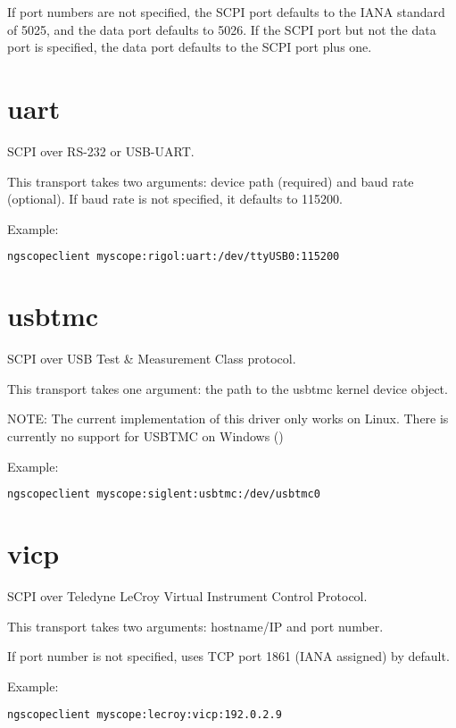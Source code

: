 If port numbers are not specified, the SCPI port defaults to the IANA standard of 5025, and the data port defaults to
5026. If the SCPI port but not the data port is specified, the data port defaults to the SCPI port plus one.

\section{uart}

SCPI over RS-232 or USB-UART.

This transport takes two arguments: device path (required) and baud rate (optional). If baud rate is not specified, it
defaults to 115200.

Example:
\begin{lstlisting}[language=sh, numbers=none]
ngscopeclient myscope:rigol:uart:/dev/ttyUSB0:115200
\end{lstlisting}

\section{usbtmc}

SCPI over USB Test \& Measurement Class protocol.

This transport takes one argument: the path to the usbtmc kernel device object.

NOTE: The current implementation of this driver only works on Linux. There is currently no support for USBTMC on
Windows ()

Example:
\begin{lstlisting}[language=sh, numbers=none]
ngscopeclient myscope:siglent:usbtmc:/dev/usbtmc0
\end{lstlisting}

\section{vicp}

SCPI over Teledyne LeCroy Virtual Instrument Control Protocol.

This transport takes two arguments: hostname/IP and port number.

If port number is not specified, uses TCP port 1861 (IANA assigned) by default.

Example:
\begin{lstlisting}[language=sh, numbers=none]
ngscopeclient myscope:lecroy:vicp:192.0.2.9
\end{lstlisting}


